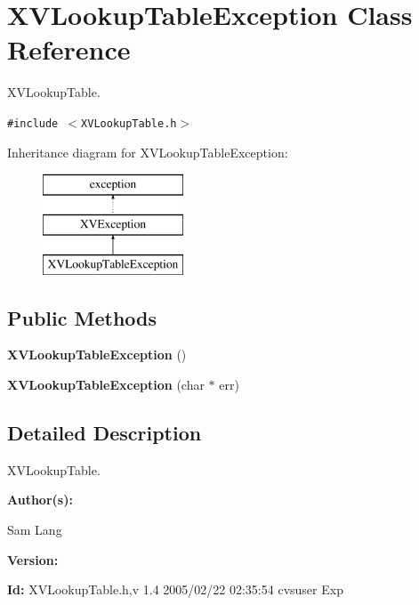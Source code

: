 \hypertarget{class_XVLookupTableException}{
\section{XVLookup\-Table\-Exception  Class Reference}
\label{XVLookupTableException}
}
XVLookup\-Table. 


{\tt \#include $<$XVLookup\-Table.h$>$}

Inheritance diagram for XVLookup\-Table\-Exception:\begin{figure}[H]
\begin{center}
\leavevmode
\includegraphics[height=3cm]{class_XVLookupTableException}
\end{center}
\end{figure}
\subsection*{Public Methods}
\begin{CompactItemize}
\item 
{\bf XVLookup\-Table\-Exception} ()
\item 
{\bf XVLookup\-Table\-Exception} (char $\ast$ err)
\end{CompactItemize}


\subsection{Detailed Description}
XVLookup\-Table.

\begin{Desc}
\item[{\bf Author(s): }]\par
 Sam Lang \end{Desc}
\begin{Desc}
\item[{\bf Version: }]\par
 \end{Desc}
\begin{Desc}
\item[{\bf Id: }] XVLookup\-Table.h,v 1.4 2005/02/22 02:35:54 cvsuser Exp \end{Desc}


